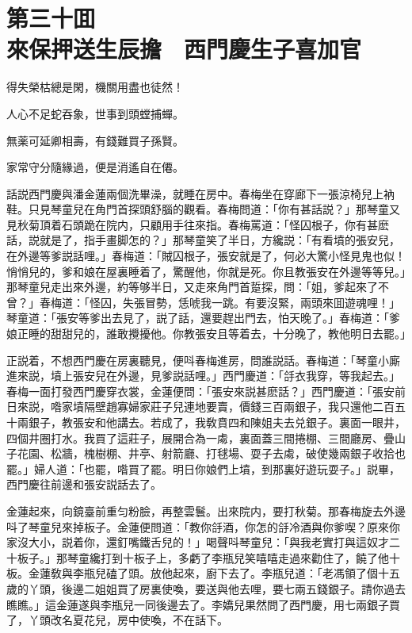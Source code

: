 
\chapter*{第三十囬　\\來保押送生辰擔　西門慶生子喜加官}


\begin{myquote}
得失榮枯總是閑，機關用盡也徒然！

人心不足蛇吞象，世事到頭螳捕蟬。

無薬可延卿相壽，有錢難買子孫賢。

家常守分隨緣過，便是消遙自在僊。
\end{myquote}

話説西門慶與潘金蓮兩個洗畢澡，就睡在房中。春梅坐在穿廊下一張涼椅兒上衲鞋。只見琴童兒在角門首探頭舒腦的觀看。春梅問道：「你有甚話説？」那琴童又見秋菊頂着石頭跪在院内，只顧用手往來指。春梅罵道：「怪囚根子，你有甚麽話，説就是了，指手畫脚怎的？」那琴童笑了半日，方纔説：「有看墳的張安兒，在外邊等爹説話哩。」春梅道：「賊囚根子，張安就是了，何必大驚小怪見鬼也似！悄悄兒的，爹和娘在屋裏睡着了，驚醒他，你就是死。你且教張安在外邊等等兒。」那琴童兒走出來外邊，約等够半日，又走來角門首踅探，問：「姐，爹起來了不曾？」春梅道：「怪囚，失張冒勢，恁唬我一跳。有要沒緊，兩頭來囬遊魂哩！」琴童道：「張安等爹出去見了，説了話，還要趕出門去，怕天晚了。」春梅道：「爹娘正睡的甜甜兒的，誰敢攪擾他。你教張安且等着去，十分晚了，教他明日去罷。」

正説着，不想西門慶在房裏聽見，便呌春梅進房，問誰説話。春梅道：「琴童小廝進來説，墳上張安兒在外邊，見爹説話哩。」西門慶道：「㧱衣我穿，等我起去。」春梅一面打發西門慶穿衣裳，金蓮便問：「張安來説甚麽話？」西門慶道：「張安前日來説，喒家墳隔壁趙寡婦家莊子兒連地要賣，價錢三百兩銀子，我只還他二百五十兩銀子，教張安和他講去。若成了，我敎賁四和陳姐夫去兑銀子。裏面一眼井，四個井圈打水。我買了這莊子，展開合為一䖏，裏面蓋三間捲棚、三間廳房、疊山子花園、松牆，槐樹棚、井亭、射箭廳、打毬場、耍子去䖏，破使幾兩銀子收拾也罷。」婦人道：「也罷，喒買了罷。明日你娘們上墳，到那裏好遊玩耍子。」説畢，西門慶往前邊和張安説話去了。

金蓮起來，向鏡臺前重匀粉臉，再整雲鬟。出來院内，要打秋菊。那春梅旋去外邊呌了琴童兒來掉板子。金蓮便問道：「教你㧱酒，你怎的㧱冷酒與你爹喫？原來你家沒大小，説着你，還釘嘴鐵舌兒的！」喝聲呌琴童兒：「與我老實打與這奴才二十板子。」那琴童纔打到十板子上，多虧了李瓶兒笑嘻嘻走過來勸住了，饒了他十板。金蓮敎與李瓶兒磕了頭。放他起來，廚下去了。李瓶兒道：「老馮領了個十五歲的丫頭，後邊二姐姐買了房裏使喚，要送與他去哩，要七兩五錢銀子。請你過去瞧瞧。」這金蓮遂與李瓶兒一同後邊去了。李嬌兒果然問了西門慶，用七兩銀子買了，丫頭改名夏花兒，房中使喚，不在話下。


